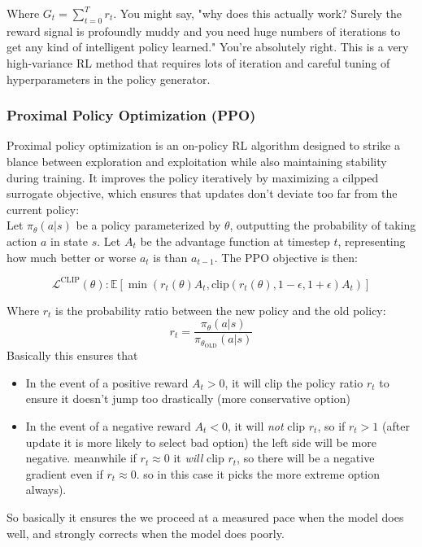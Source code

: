 \documentclass[12pt]{article}
\begin{document}
Where \(G_t = \sum_{t=0}^Tr_t\). You might say, "why does this actually work? Surely the reward signal is profoundly muddy and you need huge numbers of iterations to get any kind of intelligent policy learned." You're absolutely right.  This is a very high-variance RL method that requires lots of iteration and careful tuning of hyperparameters in the policy generator.
\subsubsection{Proximal Policy Optimization (PPO)}
Proximal policy optimization is an on-policy RL algorithm designed to strike a blance between exploration and exploitation while also maintaining stability during training. It improves the policy iteratively by maximizing a cilpped surrogate objective, which ensures that updates don't deviate too far from the current policy:\\

Let \(\pi_\theta(a|s)\) be a policy parameterized by \(\theta\), outputting the probability of taking action \(a\) in state \(s\). Let \(A_t\) be the advantage function at timestep \(t\), representing how much better or worse \(a_t\) is than \(a_{t-1}\). The PPO objective is then:

\[\mathcal{L}^{\text{CLIP}}(\theta): \mathbb{E}\left[\min (r_t(\theta)A_t, \text{clip}(r_t(\theta), 1 - \epsilon, 1+\epsilon)A_t)\right]\]

Where \(r_t\) is the probability ratio between the new policy and the old policy:
\[r_t = \frac{\pi_\theta(a|s)}{\pi_{\theta_{\text{OLD}}}(a|s)}\]
Basically this ensures that

\begin{itemize}
\item In the event of a positive reward \(A_t > 0\), it will clip the policy ratio \(r_t\) to ensure it doesn't jump too drastically (more conservative option)
\item In the event of a negative reward \(A_t < 0\), it will \emph{not} clip \(r_t\), so if \(r_t > 1\) (after update it is more likely to select bad option) the left side will be more negative. meanwhile if \(r_t \approx 0\) it \emph{will} clip \(r_t\), so there will be a negative gradient even if \(r_t \approx 0\). so in this case it picks the more extreme option always).
\end{itemize}

So basically it ensures the we proceed at a measured pace when the model does well, and strongly corrects when the model does poorly. \\
\end{document}
